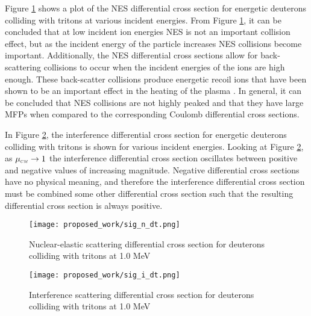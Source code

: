 \documentclass[../main.tex]{subfiles}
\begin{document}
Figure \ref{fig:sig_n} shows a plot of the NES differential cross section for energetic deuterons colliding with tritons at various incident energies. From Figure \ref{fig:sig_n}, it can be concluded that at low incident ion energies NES is not an important collision effect, but as the incident energy of the particle increases NES collisions become important. Additionally, the NES differential cross sections allow for back-scattering collisions to occur when the incident energies of the ions are high enough. These back-scatter collisions produce energetic recoil ions that have been shown to be an important effect in the heating of the plasma \cite{Nakao-1988}. In general, it can be concluded that NES collisions are not highly peaked and that they have large MFPs when compared to the corresponding Coulomb differential cross sections.

In Figure \ref{fig:sig_i}, the interference differential cross section for energetic deuterons colliding with tritons is shown for various incident energies. Looking at Figure \ref{fig:sig_i}, as $\mucm \rightarrow 1$ the interference differential cross section oscillates between positive and negative values of increasing magnitude. Negative differential cross sections have no physical meaning, and therefore the interference differential cross section must be combined some other differential cross section such that the resulting differential cross section is always positive.

\begin{figure}[!htb]
    \centering
    \texttt{[image: proposed\_work/sig\_n\_dt.png]}
    \caption{Nuclear-elastic scattering differential cross section for deuterons colliding with tritons at 1.0 MeV}
    \label{fig:sig_n}
\end{figure}

\begin{figure}[!htb]
    \centering
    \texttt{[image: proposed\_work/sig\_i\_dt.png]}
    \caption{Interference scattering differential cross section for deuterons colliding with tritons at 1.0 MeV}
    \label{fig:sig_i}
\end{figure}
\end{document}
